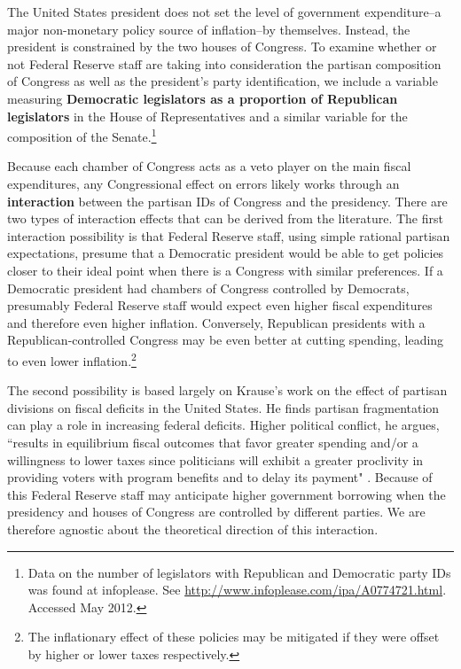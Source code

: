 \documentclass[a4paper]{article}\usepackage{graphicx, color}
\begin{document}
The United States president does not set the level of government expenditure--a major non-monetary policy source of inflation--by themselves. Instead, the president is constrained by the two houses of Congress. To examine whether or not Federal Reserve staff are taking into consideration the partisan composition of Congress as well as the president's party identification, we include a variable measuring {\bf{Democratic legislators as a proportion of Republican legislators}} in the House of Representatives and a similar variable for the composition of the Senate.\footnote{Data on the number of legislators with Republican and Democratic party IDs was found at infoplease. See {\url{http://www.infoplease.com/ipa/A0774721.html}}. Accessed May 2012.} 

Because each chamber of Congress acts as a veto player on the main fiscal expenditures, any Congressional effect on errors likely works through an \textbf{interaction} between the partisan IDs of Congress and the presidency. There are two types of interaction effects that can be derived from the literature. The first interaction possibility is that Federal Reserve staff, using simple rational partisan expectations, presume that a Democratic president would be able to get policies closer to their ideal point when there is a Congress with similar preferences. If a Democratic president had chambers of Congress controlled by Democrats, presumably Federal Reserve staff would expect even higher fiscal expenditures and therefore even higher inflation. Conversely, Republican presidents with a Republican-controlled Congress may be even better at cutting spending, leading to even lower inflation.\footnote{The inflationary effect of these policies may be mitigated if they were offset by higher or lower taxes respectively.}

The second possibility is based largely on Krause's \citeyearpar{Krause2000} work on the effect of partisan divisions on fiscal deficits in the United States. He finds partisan fragmentation can play a role in increasing federal deficits. Higher political conflict, he argues, ``results in equilibrium fiscal outcomes that favor greater spending and/or a willingness to lower taxes since politicians will exhibit a greater proclivity in providing voters with program benefits and to delay its payment" \citep[][542]{Krause2000}. Because of this Federal Reserve staff may anticipate higher government borrowing when the presidency and houses of Congress are controlled by different parties. We are therefore agnostic about the theoretical direction of this interaction.
\end{document}
